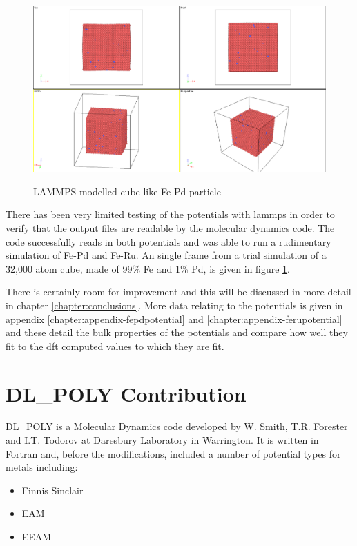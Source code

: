 \begin{figure}[htb]
\includegraphics[width=.94\linewidth]{chapters/potentials_fe_pd_ru/lammps/fepd_fct_cube_particle.png} 
\label{fig:fepd-lammps-trial}
\caption{LAMMPS modelled cube like Fe-Pd particle}
\end{figure}

There has been very limited testing of the potentials with \acrshort{lammps} in order to verify that the output files are readable by the molecular dynamics code.  The code successfully reads in both potentials and was able to run a rudimentary simulation of Fe-Pd and Fe-Ru.  An single frame from a trial simulation of a 32,000 atom cube, made of 99\% Fe and 1\% Pd, is given in figure \ref{fig:fepd-lammps-trial}.

There is certainly room for improvement and this will be discussed in more detail in chapter \ref{chapter:conclusions}.  More data relating to the potentials is given in appendix \ref{chapter:appendix-fepdpotential} and \ref{chapter:appendix-ferupotential} and these detail the bulk properties of the potentials and compare how well they fit to the \acrshort{dft} computed values to which they are fit.



\section{DL\_POLY Contribution}

DL\_POLY is a Molecular Dynamics code developed by W. Smith, T.R. Forester and I.T. Todorov at Daresbury Laboratory in Warrington. It is written in Fortran and, before the modifications, included a number of potential types for metals including:

\begin{itemize}
\item Finnis Sinclair
\item EAM
\item EEAM
\end{itemize}

